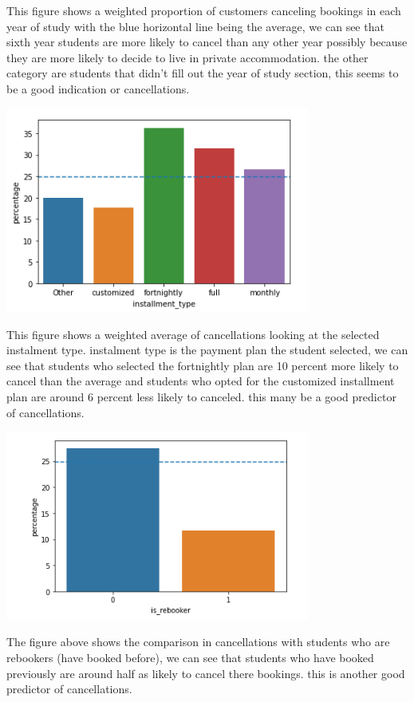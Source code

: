   This figure shows a weighted proportion of customers canceling bookings in each year of study with the blue horizontal line being the average, we can see that sixth year students are more likely to cancel than any other year possibly because they are more likely to decide to live in private accommodation. the other category are students that didn't fill out the year of study section, this seems to be a good indication or cancellations.
  
  \includegraphics[width=10cm]{figures/instalment_type.png}
  
  This figure shows a weighted average of cancellations looking at the selected instalment type. instalment type is the payment plan the student selected, we can see that students who selected the fortnightly plan are 10 percent more likely to cancel than the average and students who opted for the customized installment plan are around 6 percent less likely to canceled. this many be a good predictor of cancellations.
  
  \includegraphics[width=10cm]{figures/is_rebooker.png}
  
  The figure above shows the comparison in cancellations with students who are rebookers (have booked before), we can see that students who have booked previously are around half as likely to cancel there bookings. this is another good predictor of cancellations.  
  

